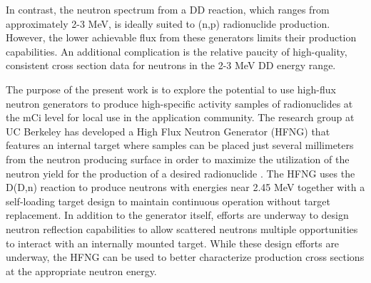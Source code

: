 \documentclass[5p]{elsarticle}
\begin{document}
In contrast,  the neutron spectrum from a DD reaction, which ranges from approximately 2-3 MeV, is ideally suited to (n,p) radionuclide production.
However, the lower achievable flux from these generators limits their production capabilities.
 An additional complication is the relative paucity of high-quality, consistent cross section data for neutrons in the 2-3 MeV DD energy range.
 

The purpose of the present work is to explore the potential to use high-flux neutron generators to produce high-specific activity samples of radionuclides at the mCi level for local use in the application community. 
 The research group at UC Berkeley has  developed a High Flux Neutron Generator (HFNG) that features an internal target where samples can be placed just several millimeters from the neutron producing surface in order to maximize the utilization of the neutron yield for the production of a desired radionuclide \cite{Waltz2017,Waltz2016a,doi:10.1063/1.3267832}.
 The HFNG uses the D(D,n) reaction to produce neutrons with energies near 2.45 MeV together with a self-loading target design to maintain continuous operation without target replacement.
 In addition to the generator itself, efforts are underway to design neutron reflection capabilities to allow scattered neutrons multiple opportunities to interact with an  internally mounted target.
While these design efforts are underway, the HFNG can be used to better characterize production cross sections at the appropriate neutron energy.
\end{document}
